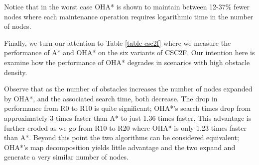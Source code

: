Notice that in the worst case OHA* is shown to maintain between 12-37\% fewer nodes where each
maintenance operation requires logarithmic time in the number of nodes.
\par
Finally, we turn our attention to Table \ref{table-csc2f} where we measure the 
performance of A* and OHA* on the six variants of CSC2F.
Our intention here is examine how the performance of OHA* degrades in scenarios with
high obstacle density.

Observe that as the number of obstacles increases the number of nodes expanded by OHA*, and the
associated search time, both decrease. 
The drop in performance from R0 to R10 is quite significant; OHA*'s search times drop
from approximately 3 times faster than A* to just 1.36 times faster.
This advantage is further eroded as we go from R10 to R20 where OHA* is only 
1.23 times faster than A*.
Beyond this point the two algorithms can be considered equivalent;
OHA*'s map decomposition yields little advantage and the two expand and generate 
a very similar number of nodes.
